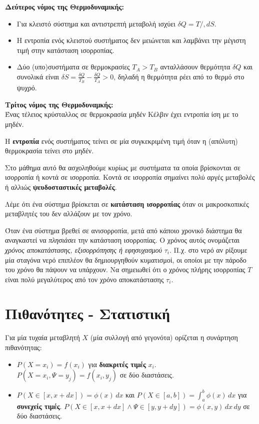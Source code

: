 \documentclass[11pt, oneside]{article}   	%
\newcommand{\definition}[1]{
	\begin{tcolorbox}[colback=blue!5!white,colframe=blue!75!black,title=\textbf{Ορισμός}]
		\begin{center}
			#1
		\end{center}
	\end{tcolorbox}
}
\newcommand{\note}[1]{
	\begin{tcolorbox}[colback=yellow!5!white,colframe=yellow!75!black,title=\textbf{Σημείωση}]
		\begin{center}
			#1
		\end{center}
	\end{tcolorbox}
}
\begin{document}
\definition{\textbf{Δεύτερος νόμος της Θερμοδυναμικής:}\\ \begin{itemize}
		\item Για κλειστό σύστημα και αντιστρεπτή μεταβολή ισχύει $\delta Q = T /, dS$.
		\item Η εντροπία ενός κλειστού συστήματος δεν μειώνεται και λαμβάνει την μέγιστη τιμή στην κατάσταση ισορροπίας.
		\item Δύο (υπο)συστήματα σε θερμοκρασίες $T_A>T_B$ ανταλλάσουν θερμότητα $\delta Q$ και συνολικά είναι $\delta S = \frac{\delta Q}{T_B}-\frac{\delta Q}{T_A}>0$, δηλαδή η θερμότητα ρέει από το θερμό στο ψυχρό.	 
\end{itemize}}

\definition{\textbf{Τρίτος νόμος της Θερμοδυναμκής:}\\ Ένας τέλειος κρύσταλλος σε θερμοκρασία μηδέν Κέλβιν έχει εντροπία ίση με το μηδέν.}

\note{Η \textbf{εντροπία} ενός συστήματος τείνει σε μία συγκεκριμένη τιμή όταν η (απόλυτη) θερμοκρασία τείνει στο μηδέν.}

Στο μάθημα αυτό θα ασχοληθούμε κυρίως με συστήματα τα οποία βρίσκονται σε ισορροπία ή κοντά σε ισορροπία. Κοντά σε ισορροπία σημαίνει πολύ αργές μεταβολές ή αλλιώς \textbf{ψευδοσταστικές μεταβολές}.

\definition{Λέμε ότι ένα σύστημα βρίσκεται σε \textbf{κατάσταση ισορροπίας} όταν
	οι μακροσκοπικές μεταβλητές του δεν αλλάζουν με τον χρόνο.}
	
Όταν ένα σύστημα βρεθεί σε ανισορροπία, μετά από κάποιο χρονικό διάστημα θα αναγκαστεί να \textit{πλησιάσει} την κατάσταση ισορροπίας. Ο χρόνος αυτός ονομάζεται \textit{χρόνος αποκατάστασης, εξισορρόπησης ή εφησυχασμού} $\tau_i$. Π.χ. στο νερό αν ρίξουμε μία σταγόνα νερό επιπλέον θα δημιουργηθούν κυματισμοί, οι οποίοι με την πάροδο του χρόνο θα πάψουν να υπάρχουν. Να σημειωθεί ότι ο χρόνος πλήρης ισορροπίας $T$ είναι πολύ μεγαλύτερος από τον χρόνο αποκατάστασης $\tau_i$.

\section{Πιθανότητες - Στατιστική}

\definition{Για μία τυχαία μεταβλητή $X$ (μία συλλογή από γεγονότα) ορίζεται η συνάρτηση πιθανότητας:
\begin{itemize}
	\item $P(X=x_i)=f(x_i)$ για \textbf{διακριτές τιμές} $x_i$. $P(X=x_i, \Psi = y_j)=f(x_i,y_j)$ σε δύο διαστάσεις.
	\item  $P(X \in [x,x+dx])=\phi (x)\, dx$ και $P(X\in [a,b])=\int_{a}^{b} \phi (x) \, dx$ για \textbf{συνεχείς τιμές}. $P(X \in [x,x+dx]\land \Psi \in [y,y+dy])=\phi(x,y) \, dx \, dy$ σε δύο διαστάσεις.
	\end{itemize}
}
	
\end{document}
